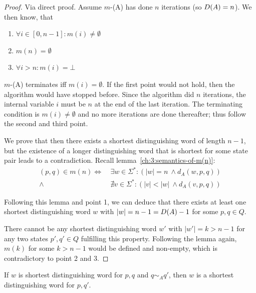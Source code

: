 \begin{proof}
	Via direct proof. Assume $m$-\CompDist(A) has done $n$ iterations (so $D(A) = n$). We then know, that
	\begin{enumerate}
		\item $\forall i \in [0,n-1]\colon m(i) \neq \emptyset$
		\item $m(n)= \emptyset$
		\item $\forall i > n\colon m(i)= \bot$
	\end{enumerate}
	$m$-\CompDist(A) terminates iff $m(i) = \emptyset$. If the first point would not hold, then the algorithm would have stopped before. Since the algorithm did $n$ iterations, the internal variable $i$ must be $n$ at the end of the last iteration. The terminating condition is $m(i) \neq \emptyset$ and no more iterations are done thereafter; thus follow the second and third point.
    
    We prove that then there exists a shortest distinguishing word of length $n-1$, but the existence of a longer distinguishing word that is shortest for some state pair leads to a contradiction. Recall lemma~\ref{ch:3:semantics-of-m(n)}:
    \begin{align*}
    (p,q) \in m(n) \Longleftrightarrow\ &\exists w\in\Sigma^*\colon (|w| = n\ \land d_A(w, p, q))\\
    \land\ &\nexists v\in\Sigma^*\colon (|v| < |w|\ \land d_A(v, p, q))
    \end{align*}

	
	\noindent Following this lemma and point 1, we can deduce that there exists at least one shortest distinguishing word $w$ with $|w| = n-1 = D(A)-1$ for some $p,q \in Q$.
	
	
	There cannot be any shortest distinguishing word $w'$ with $|w'| = k > n-1$ for any two states $p',q'\in Q$ fulfilling this property. Following the lemma again, $m(k)$ for some $k > n-1$ would be defined and non-empty, which is contradictory to point 2 and 3.
\end{proof}

\begin{lemma}\label{ch:3:lem:disting-trans}
	If $w$ is shortest distinguishing word for $p,q$ and $q \sim_A q'$, then $w$ is a shortest distinguishing word for $p,q'$.
\end{lemma}

